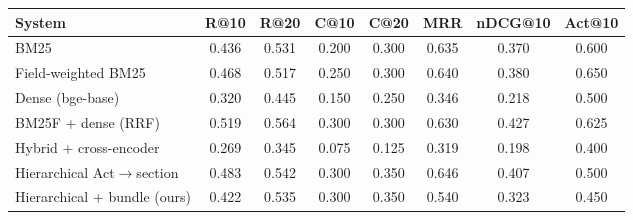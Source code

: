 \begin{tabular}{lccccccc}
\toprule
System & R@10 & R@20 & C@10 & C@20 & MRR & nDCG@10 & Act@10 \\
\midrule
BM25 & 0.436 & 0.531 & 0.200 & 0.300 & 0.635 & 0.370 & 0.600 \\
Field-weighted BM25 & 0.468 & 0.517 & 0.250 & 0.300 & 0.640 & 0.380 & 0.650 \\
Dense (bge-base) & 0.320 & 0.445 & 0.150 & 0.250 & 0.346 & 0.218 & 0.500 \\
BM25F + dense (RRF) & 0.519 & 0.564 & 0.300 & 0.300 & 0.630 & 0.427 & 0.625 \\
Hybrid + cross-encoder & 0.269 & 0.345 & 0.075 & 0.125 & 0.319 & 0.198 & 0.400 \\
Hierarchical Act$\rightarrow$section & 0.483 & 0.542 & 0.300 & 0.350 & 0.646 & 0.407 & 0.500 \\
Hierarchical + bundle (ours) & 0.422 & 0.535 & 0.300 & 0.350 & 0.540 & 0.323 & 0.450 \\
\bottomrule
\end{tabular}
